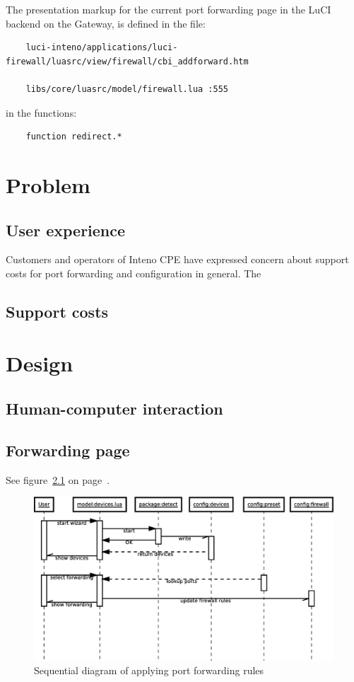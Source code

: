 \documentclass[a4paper,11pt]{kth-mag}
\begin{document}
The presentation markup for the current port forwarding page in the LuCI backend on the Gateway, is defined in the file:

\begin{verbatim}
    luci-inteno/applications/luci-firewall/luasrc/view/firewall/cbi_addforward.htm

    libs/core/luasrc/model/firewall.lua :555
\end{verbatim}

in the functions:

\begin{verbatim}
    function redirect.*
\end{verbatim}

\chapter{Problem}
   \section{User experience}
Customers and operators of Inteno CPE have expressed concern about support costs for port forwarding and configuration in general.
The 

   \section{Support costs}

\chapter{Design}
   \section{Human-computer interaction}
   \section{Forwarding page}

See figure~\ref{fig:wizard-seq_dia} on page~\pageref{fig:wizard-seq_dia}.
\begin{figure}[h!]
   \centering
   \includegraphics[width=15cm]{wizard-seq_dia}
   \caption{Sequential diagram of applying port forwarding rules}
   \label{fig:wizard-seq_dia}
\end{figure}
\end{document}
